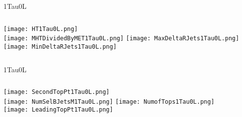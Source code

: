 \documentclass{beamer}
\begin{document}
\begin{frame}{1Tau0L}
    \begin{columns}[t]
    \centering
    \texttt{[image: HT1Tau0L.png]}\\
    \texttt{[image: MHTDividedByMET1Tau0L.png]}
    \centering
    \texttt{[image: MaxDeltaRJets1Tau0L.png]}\\
    \texttt{[image: MinDeltaRJets1Tau0L.png]}
    \end{columns}
\end{frame}
\begin{frame}{1Tau0L}
    \begin{columns}[t]
    \centering
    \texttt{[image: SecondTopPt1Tau0L.png]}\\
    \texttt{[image: NumSelBJetsM1Tau0L.png]}
    \centering
    \texttt{[image: NumofTops1Tau0L.png]}\\
    \texttt{[image: LeadingTopPt1Tau0L.png]}
    \end{columns}
\end{frame}
\end{document}
